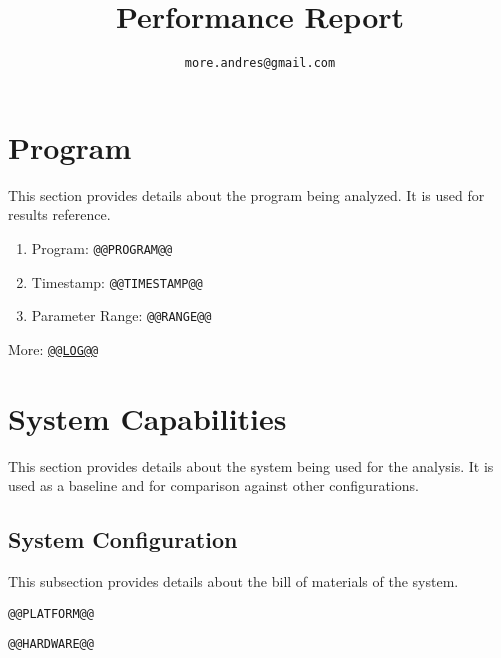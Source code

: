 \documentclass[a4paper, twocolumn]{article}
\begin{document}
\title{Performance Report}

\author{\tt more.andres@gmail.com}

\maketitle


\tableofcontents

\section{Program}

This section provides details about the program being analyzed.
It is used for results reference.

\begin{enumerate}
\item Program: {\tt @@PROGRAM@@}
\item Timestamp: {\tt @@TIMESTAMP@@}
\item Parameter Range: {\tt @@RANGE@@}
\end{enumerate}

More: \href{TBD}{\tt @@LOG@@}

\section{System Capabilities}

This section provides details about the system being used for the analysis.
It is used as a baseline and for comparison against other configurations.

\subsection{System Configuration}

This subsection provides details about the bill of materials of the system.

\begin{verbatim}
@@PLATFORM@@
\end{verbatim}

\begin{verbatim}
@@HARDWARE@@
\end{verbatim}
\end{document}
